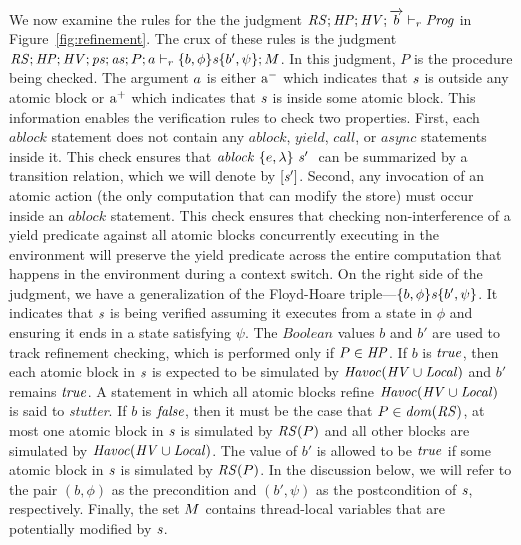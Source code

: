 We now examine the rules for the the judgment $\mathit{RS};\mathit{HP};\mathit{HV};\overrightarrow{b} \vdash_r \mathit{Prog}$ in Figure~\ref{fig:refinement}.
The crux of these rules is the judgment $\mathit{RS};\mathit{HP};\mathit{HV};\mathit{ps};\mathit{as};P;a \vdash_r \{b, \phi\} \mathit{s} \{b', \psi\};M$.
In this judgment, $P$ is the procedure being checked.
The argument $a$ is either
$\mathrm{a^-}$ which indicates that $\mathit{s}$ is outside any atomic block or
$\mathrm{a^+}$ which indicates that $\mathit{s}$ is inside some atomic block.
This information enables the verification rules to check two properties.
First, each $\mathit{ablock}$ statement does not contain any $\mathit{ablock}$, $\mathit{yield}$, $\mathit{call}$, or $\mathit{async}$ statements inside it.
This check ensures that $\mathit{ablock}\ {\{e,\lambda\}}\ {\mathit{s}'}\ $ can be summarized by a transition relation, which we will denote by $[\mathit{s}']$.
Second, any invocation of an atomic action (the only computation that can modify the store) must occur inside an $\mathit{ablock}$ statement.
This check ensures that checking non-interference of a yield predicate against all atomic blocks concurrently executing 
in the environment will preserve the yield predicate across the entire computation that happens in the environment during a context switch.
On the right side of the judgment, we have a generalization of the Floyd-Hoare triple---$\{b,\phi\} \mathit{s} \{b',\psi\}$.
It indicates that $\mathit{s}$ is being verified assuming it executes from a state in $\phi$ and ensuring it ends in a state satisfying $\psi$.
The $\mathit{Boolean}$ values $b$ and $b'$ are used to track refinement checking, which is performed only if $P \in \mathit{HP}$.
If $b$ is $\mathit{true}$, then each atomic block in $\mathit{s}$ is expected to be simulated by $\mathit{Havoc}(\mathit{HV} \cup \mathit{Local})$ and $b'$ remains $\mathit{true}$.
A statement in which all atomic blocks refine $\mathit{Havoc}(\mathit{HV} \cup \mathit{Local})$ is said to {\em stutter}.
If $b$ is $\mathit{false}$, then it must be the case that $P \in \mathit{dom}(\mathit{RS})$, at most one atomic block in $\mathit{s}$ is simulated by $\mathit{RS}(P)$
and all other blocks are simulated by $\mathit{Havoc}(\mathit{HV} \cup \mathit{Local})$.
The value of $b'$ is allowed to be $\mathit{true}$ if some atomic block in $\mathit{s}$ is simulated by $\mathit{RS}(P)$.
In the discussion below, we will refer to the pair $(b,\phi)$ as the precondition and $(b',\psi)$
as the postcondition of $\mathit{s}$, respectively.
Finally, the set $M$ contains thread-local variables that are potentially modified by $\mathit{s}$.

